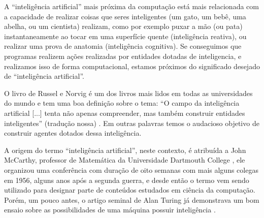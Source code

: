 \documentclass[a4paper,12pt]{book}
\begin{document}
A ``inteligência artificial'' mais próxima da computação está mais relacionada com a capacidade de realizar coisas que seres inteligentes (um gato, um bebê, uma abelha, ou um cientista) realizam, como por exemplo puxar a mão (ou pata) instantaneamente ao tocar em uma superfície quente (inteligência reativa), ou realizar uma prova de anatomia (inteligência cognitiva). Se conseguimos que programas realizem ações realizadas por entidades dotadas de inteligencia, e realizamos isso  de forma computacional, estamos próximos do significado desejado de ``inteligência artificial''.

O livro de Russel e Norvig é um dos livros mais lidos em todas as universidades do mundo e tem uma boa definição sobre o tema: ``O campo da inteligência artificial [...] tenta não apenas compreender, mas também construir entidades inteligentes'' (tradução nossa) \cite{norvig2002}.  Em outras palavras temos o audacioso objetivo de construir agentes dotados dessa inteligência.

A origem do termo ``inteligência artificial'', neste contexto, é atribuída a John McCarthy, professor de Matemática da Universidade Dartmouth College \cite{blipblog}, ele organizou uma conferência com duração de oito semanas com mais alguns colegas em 1956, alguns anos após a segunda guerra, e desde então o termo vem sendo utilizado para designar parte de conteúdos estudados em ciência da computação. Porém, um pouco antes, o artigo seminal de Alan Turing já demonstrava um bom ensaio sobre as possibilidades de uma máquina possuir inteligência \cite{Turing1950}.
\end{document}
